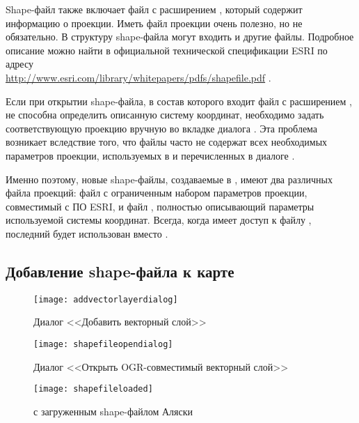 Shape-файл также включает файл с расширением , который
содержит информацию о проекции. Иметь файл проекции очень полезно, но не
обязательно. В структуру shape-файла могут входить и другие файлы. Подробное
описание можно найти в официальной технической спецификации ESRI по адресу \\
\url{http://www.esri.com/library/whitepapers/pdfs/shapefile.pdf} .


Если при открытии shape-файла, в состав которого входит файл с расширением
, \qg не способна определить описанную систему координат,
необходимо задать соответствующую проекцию вручную во вкладке
 диалога . Эта проблема возникает вследствие
того, что файлы  часто не содержат всех необходимых параметров
проекции, используемых в \qg и перечисленных в диалоге
.

Именно поэтому, новые shape-файлы, создаваемые в \qg, имеют два различных
файла проекций: файл  с ограниченным набором параметров
проекции, совместимый с ПО ESRI, и файл , полностью описывающий
параметры используемой системы координат. Всегда, когда \qg имеет доступ
к файлу , последний будет использован вместо .

\subsection{Добавление shape-файла к карте}\label{sec:load_shapefile}

\begin{figure}[ht]
   \centering
   \texttt{[image: addvectorlayerdialog]}
   \caption{Диалог <<Добавить векторный слой>> \wincaption}\label{fig:addvectorlayer}
\end{figure}

\begin{figure}[ht]
   \centering
   \texttt{[image: shapefileopendialog]}
   \caption{Диалог <<Открыть OGR-совместимый векторный слой>> \wincaption}\label{fig:openshapefile}
\end{figure}

\begin{figure}[ht]
   \centering
   \texttt{[image: shapefileloaded]}
   \caption{\qg с загруженным shape-файлом Аляски \wincaption}\label{fig:loadedshapefile}
\end{figure}

